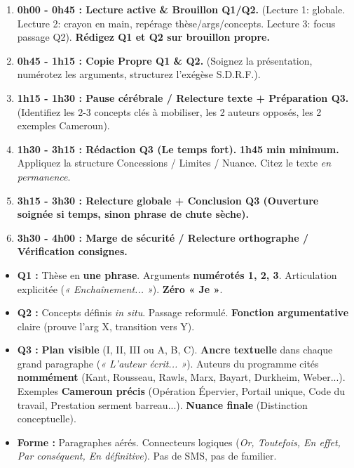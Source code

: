 \documentclass[11pt]{article}
\begin{document}
\begin{methode}
\begin{enumerate}
    \item \textbf{0h00 - 0h45 : Lecture active \& Brouillon Q1/Q2.} (Lecture 1: globale. Lecture 2: crayon en main, repérage thèse/args/concepts. Lecture 3: focus passage Q2). \textbf{Rédigez Q1 et Q2 sur brouillon propre.}
    \item \textbf{0h45 - 1h15 : Copie Propre Q1 \& Q2.} (Soignez la présentation, numérotez les arguments, structurez l'exégèse S.D.R.F.).
    \item \textbf{1h15 - 1h30 : Pause cérébrale / Relecture texte + Préparation Q3.} (Identifiez les 2-3 concepts clés à mobiliser, les 2 auteurs opposés, les 2 exemples Cameroun).
    \item \textbf{1h30 - 3h15 : Rédaction Q3 (Le temps fort).} \textbf{1h45 min minimum.} Appliquez la structure Concessions / Limites / Nuance. Citez le texte \emph{en permanence}.
    \item \textbf{3h15 - 3h30 : Relecture globale + Conclusion Q3 (Ouverture soignée si temps, sinon phrase de chute sèche).}
    \item \textbf{3h30 - 4h00 : Marge de sécurité / Relecture orthographe / Vérification consignes.}
\end{enumerate}
\end{methode}

\begin{aretenir}
\begin{itemize}
    \item [ ] \textbf{Q1 :} Thèse en \textbf{une phrase}. Arguments \textbf{numérotés 1, 2, 3}. Articulation explicitée (\emph{« Enchaînement... »}). \textbf{Zéro « Je »}.
    \item [ ] \textbf{Q2 :} Concepts définis \emph{in situ}. Passage reformulé. \textbf{Fonction argumentative} claire (prouve l'arg X, transition vers Y).
    \item [ ] \textbf{Q3 :} \textbf{Plan visible} (I, II, III ou A, B, C). \textbf{Ancre textuelle} dans chaque grand paragraphe (\emph{« L'auteur écrit... »}). Auteurs du programme cités \textbf{nommément} (Kant, Rousseau, Rawls, Marx, Bayart, Durkheim, Weber...). Exemples \textbf{Cameroun précis} (Opération Épervier, Portail unique, Code du travail, Prestation serment barreau...). \textbf{Nuance finale} (Distinction conceptuelle).
    \item [ ] \textbf{Forme :} Paragraphes aérés. Connecteurs logiques (\emph{Or, Toutefois, En effet, Par conséquent, En définitive}). Pas de SMS, pas de familier.
\end{itemize}
\end{aretenir}
\end{document}
